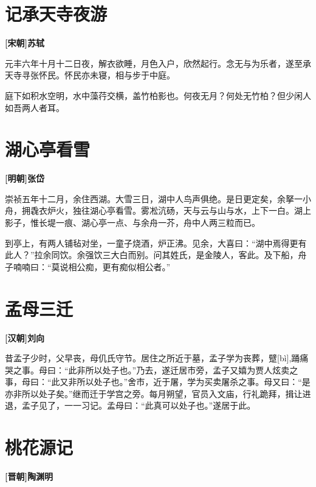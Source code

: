 \documentclass[UTF8,titlepage,oneside]{ctexbook}
\begin{document}
\chapter*{记承天寺夜游}
\begin{center}
	\textbf{[宋朝]苏轼}
\end{center}

元丰六年十月十二日夜，解衣欲睡，月色入户，欣然起行。念无与为乐者，遂至承天寺寻张怀民。怀民亦未寝，相与步于中庭。

庭下如积水空明，水中藻荇交横，盖竹柏影也。何夜无月？何处无竹柏？但少闲人如吾两人者耳。


\chapter*{湖心亭看雪}
\begin{center}
	\textbf{[明朝]张岱}
\end{center}

崇祯五年十二月，余住西湖。大雪三日，湖中人鸟声俱绝。是日更定矣，余拏一小舟，拥毳衣炉火，独往湖心亭看雪。雾凇沆砀，天与云与山与水，上下一白。湖上影子，惟长堤一痕、湖心亭一点、与余舟一芥，舟中人两三粒而已。

到亭上，有两人铺毡对坐，一童子烧酒，炉正沸。见余，大喜曰：“湖中焉得更有此人？”拉余同饮。余强饮三大白而别。问其姓氏，是金陵人，客此。及下船，舟子喃喃曰：“莫说相公痴，更有痴似相公者。”


\chapter*{孟母三迁}
\begin{center}
	\textbf{[汉朝]刘向}
\end{center}

昔孟子少时，父早丧，母仉氏守节。居住之所近于墓，孟子学为丧葬，躄[bì],踊痛哭之事。母曰：“此非所以处子也。”乃去，遂迁居市旁，孟子又嬉为贾人炫卖之事，母曰：“此又非所以处子也。”舍市，近于屠，学为买卖屠杀之事。母又曰：“是亦非所以处子矣。”继而迁于学宫之旁。每月朔望，官员入文庙，行礼跪拜，揖让进退，孟子见了，一一习记。孟母曰：“此真可以处子也。”遂居于此。



\chapter*{桃花源记}
\begin{center}
	\textbf{[晋朝]陶渊明}
\end{center}
\end{document}
